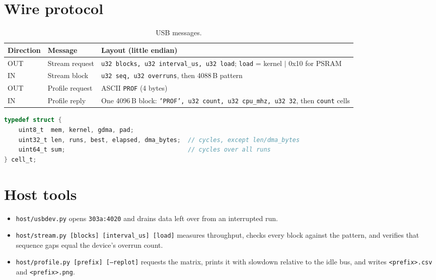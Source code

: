 \documentclass[11pt,a4paper]{article}
\begin{document}
\section{Wire protocol}
\label{sec:protocol}
\begin{table}[h]
\centering
\begin{tabularx}{\linewidth}{@{}llX@{}}
\toprule
Direction & Message & Layout (little endian) \\
\midrule
OUT & Stream request & \texttt{u32 blocks, u32 interval\_us, u32 load}; \texttt{load} = kernel $|$ 0x10 for PSRAM \\
IN  & Stream block   & \texttt{u32 seq, u32 overruns}, then 4088\,B pattern \\
OUT & Profile request& ASCII \texttt{PROF} (4 bytes) \\
IN  & Profile reply  & One 4096\,B block: \texttt{'PROF', u32 count, u32 cpu\_mhz, u32 32}, then \texttt{count} cells \\
\bottomrule
\end{tabularx}
\caption{USB messages.}
\end{table}

\begin{lstlisting}[language=C, caption={Profile cell (32 bytes).}]
typedef struct {
    uint8_t  mem, kernel, gdma, pad;
    uint32_t len, runs, best, elapsed, dma_bytes;  // cycles, except len/dma_bytes
    uint64_t sum;                                  // cycles over all runs
} cell_t;
\end{lstlisting}

\section{Host tools}
\begin{itemize}
  \item \texttt{host/usbdev.py} opens \texttt{303a:4020} and drains data left over from an interrupted run.
  \item \texttt{host/stream.py [blocks] [interval\_us] [load]} measures throughput, checks every block
        against the pattern, and verifies that sequence gaps equal the device's overrun count.
  \item \texttt{host/profile.py [prefix] [--replot]} requests the matrix, prints it with slowdown
        relative to the idle bus, and writes \texttt{<prefix>.csv} and \texttt{<prefix>.png}.
\end{itemize}
\end{document}

